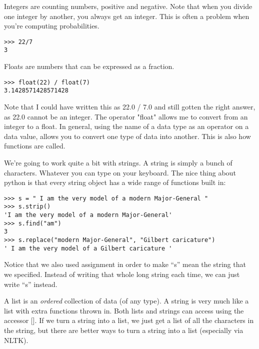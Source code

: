 \documentclass[12pt]{article}
\newenvironment{mylisting}
{\begin{list}{}{\setlength{\leftmargin}{1em}}\item\scriptsize\bfseries}
{\end{list}}
\begin{document}
\begin{enumerate}
\item[{\em int}] Integers are counting numbers, positive and negative.  Note that when you divide one integer by another, you always get an integer.  This is often a problem when you're computing probabilities.  

\begin{mylisting}
\begin{verbatim}
>>> 22/7
3
\end{verbatim}
\end{mylisting}

\item[{\em float}] Floats are numbers that can be expressed as a fraction.  

\begin{mylisting}
\begin{verbatim}
>>> float(22) / float(7)
3.1428571428571428
\end{verbatim}
\end{mylisting}

Note that I could have written this as 22.0 / 7.0 and still gotten the right answer, as 22.0 cannot be an integer.  The operator "float" allows me to convert from an integer to a float.  In general, using the name of a data type as an operator on a data value, allows you to convert one type of data into another.  This is also how functions are called.

\item[{\em string}] We're going to work quite a bit with strings.  A string is simply a bunch of characters.  Whatever you can type on your keyboard.  The nice thing about python is that every string object has a wide range of functions built in:

\begin{mylisting}
\begin{verbatim}
>>> s = " I am the very model of a modern Major-General "
>>> s.strip()
'I am the very model of a modern Major-General'
>>> s.find("am")
3
>>> s.replace("modern Major-General", "Gilbert caricature")
' I am the very model of a Gilbert caricature '
\end{verbatim}
\end{mylisting}
Notice that we also used assignment in order to make ``s'' mean the string that we specified.  Instead of writing that whole long string each time, we can just write ``s'' instead.

\item[{\em list}] A list is an {\em ordered} collection of data (of any type).  A string is very much like a list with extra functions thrown in.  Both lists and strings can access using the accessor [].  If we turn a string into a list, we just get a list of all the characters in the string, but there are better ways to turn a string into a list (especially via NLTK).


\end{enumerate}
\end{document}
